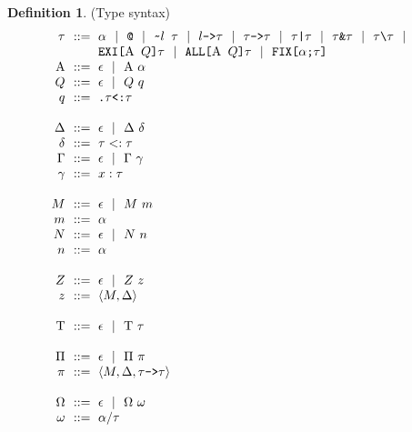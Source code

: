 \documentclass[acmsmall]{acmart}
\theoremstyle{definition}
\newtheorem{definition}{Definition}[section]
\begin{document}
\begin{definition} (Type syntax)
  \label{definition:type_syntax}
  \[\begin{array}[t]{r@{}l}
    \nonterm{\tau} & \is 
    \begin{array}[t]{@{}l}
      \code{$\alpha$} \sep 
      \code{@} \sep
      \code{\ttilde$l$ $\tau$} \sep 
      \code{$l$->$\tau$} \sep 
      \code{$\tau$->$\tau$} \sep
      \code{$\tau$|$\tau$} \sep
      \code{$\tau$\&$\tau$} \sep
      \code{$\tau$\textbackslash$\tau$} \sep 
      \\
      \code{EXI[$\Alpha$ $Q$]$\tau$} \sep 
      \code{ALL[$\Alpha$ $Q$]$\tau$} \sep 
      \code{FIX[$\alpha$;$\tau$]}
    \end{array}
    \\
    \nonterm{\Alpha} & \is \epsilon \sep \Alpha\ \alpha 
    \\
    \nonterm{Q} & \is \epsilon \sep Q\ q
    \\
    \nonterm{q} & \is \code{.$\tau$<:$\tau$} 
    \\
    \\
    \nonterm{\Delta} & \is \epsilon \sep \Delta\ \delta
    \\
    \nonterm{\delta} & \is \tau <: \tau 
    \\
    \nonterm{\Gamma} & \is \epsilon \sep \Gamma\ \gamma
    \\
    \nonterm{\gamma} & \is x : \tau
    \\
    \\
    \nonterm{M} & \is \epsilon \sep M\ m
    \\
    \nonterm{m} & \is \alpha
    \\
    \nonterm{N} & \is \epsilon \sep N\ n
    \\
    \nonterm{n} & \is \alpha
    \\
    \\
    \nonterm{Z} & \is \epsilon \sep Z\ z
    \\
    \nonterm{z} & \is \left< M, \Delta \right>
    \\
    \\
    \nonterm{\Tau} & \is \epsilon \sep \Tau\ \tau
    \\
    \\
    \nonterm{\Pi} & \is \epsilon \sep \Pi\ \pi
    \\
    \nonterm{\pi} & \is \left< M, \Delta, \tau \code{->} \tau\right>
    \\
    \\
    \nonterm{\Omega} & \is \epsilon \sep \Omega\ \omega
    \\  
    \nonterm{\omega} & \is \alpha \slash \tau
  \end{array}\]
\end{definition}
\end{document}
